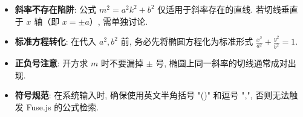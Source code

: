 \begin{trapbox}
\begin{itemize}
    \item \textbf{斜率不存在陷阱}: 公式 $m^2 = a^2k^2 + b^2$ 仅适用于斜率存在的直线. 若切线垂直于 $x$ 轴（即 $x = \pm a$）, 需单独讨论.
    \item \textbf{标准方程转化}: 在代入 $a^2, b^2$ 前, 务必先将椭圆方程化为标准形式 $\frac{x^2}{a^2} + \frac{y^2}{b^2} = 1$.
    \item \textbf{正负号注意}: 开方求 $m$ 时不要漏掉 $\pm$ 号, 椭圆上同一斜率的切线通常成对出现.
    \item \textbf{符号规范}: 在系统输入时, 确保使用英文半角括号 "()" 和逗号 ",", 否则无法触发 Fuse.js 的公式检索.
\end{itemize}
\end{trapbox}